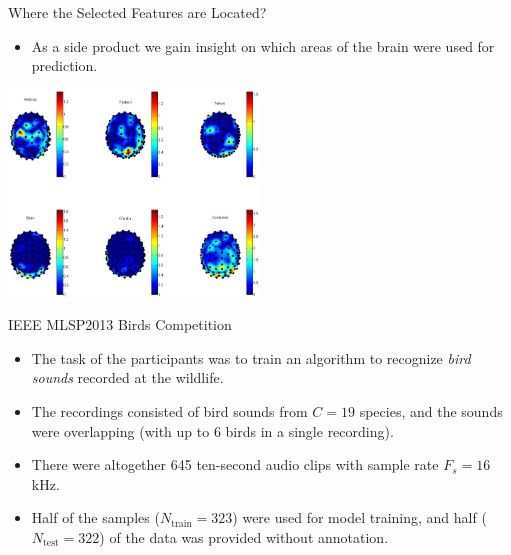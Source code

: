 \documentclass[10pt, aspectratio=169]{beamer} %
\begin{document}
\begin{frame}
{Where the Selected Features are Located?}
\begin{itemize}
\item As a side product we gain insight on which areas of the brain were used for prediction.
\end{itemize}
\centerline{\includegraphics[width=0.5\textwidth]{Topoplots.png}}
\end{frame}

\begin{frame}
{IEEE MLSP2013 Birds Competition}
\begin{itemize}
\item The task of the participants was to
train an algorithm to recognize \emph{bird sounds} recorded at the wildlife.
\item The recordings consisted of bird sounds from $C = 19$ species, and the sounds
were overlapping (with up to 6 birds in a single recording).
\item There were altogether
645 ten-second audio clips with sample rate $F_s = 16$ kHz. 
\item Half of the samples
($N_{\text{train}} = 323$) were used for model training, and half 
($N_{\text{test}} = 322$) of the data 
was provided without annotation. 
\end{itemize}
\end{frame}
\end{document}
